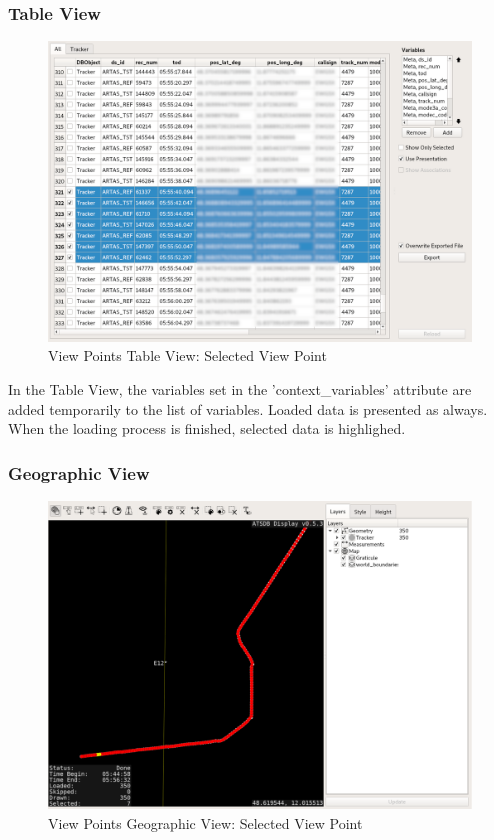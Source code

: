 \subsubsection{Table View} 

\begin{figure}[H]
    \hspace*{-2cm}
    \includegraphics[width=18cm,frame]{figures/view_points_tableview_selected.png}
  \caption{View Points Table View: Selected View Point}
\end{figure}

In the Table View, the variables set in the 'context\_variables' attribute are added temporarily to the list of variables. Loaded data is presented as always. When the loading process is finished, selected data is highlighed.

\subsubsection{Geographic View}

\begin{figure}[H]
    \hspace*{-2cm}
    \includegraphics[width=18cm,frame]{figures/view_points_geoview_selected.png}
  \caption{View Points Geographic View: Selected View Point}
\end{figure}


